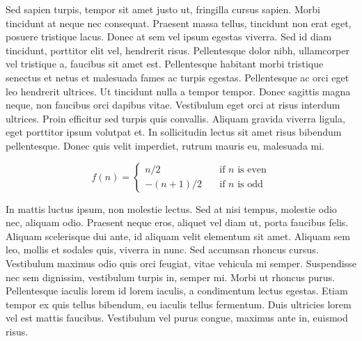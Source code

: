 Sed sapien turpis, tempor sit amet justo ut, fringilla cursus sapien. Morbi tincidunt at neque nec consequat. Praesent massa tellus, tincidunt non erat eget, posuere tristique lacus. Donec at sem vel ipsum egestas viverra. Sed id diam tincidunt, porttitor elit vel, hendrerit risus. Pellentesque dolor nibh, ullamcorper vel tristique a, faucibus sit amet est. Pellentesque habitant morbi tristique senectus et netus et malesuada fames ac turpis egestas. Pellentesque ac orci eget leo hendrerit ultrices. Ut tincidunt nulla a tempor tempor. Donec sagittis magna neque, non faucibus orci dapibus vitae. Vestibulum eget orci at risus interdum ultrices. Proin efficitur sed turpis quis convallis. Aliquam gravida viverra ligula, eget porttitor ipsum volutpat et. In sollicitudin lectus sit amet risus bibendum pellentesque. Donec quis velit imperdiet, rutrum mauris eu, malesuada mi.


\[ f(n) =
  \begin{cases}
    n/2       & \quad \text{if } n \text{ is even}\\
    -(n+1)/2  & \quad \text{if } n \text{ is odd}
  \end{cases}
\]

In mattis luctus ipsum, non molestie lectus. Sed at nisi tempus, molestie odio nec, aliquam odio. Praesent neque eros, aliquet vel diam ut, porta faucibus felis. Aliquam scelerisque dui ante, id aliquam velit elementum sit amet. Aliquam sem leo, mollis et sodales quis, viverra in nunc. Sed accumsan rhoncus cursus. Vestibulum maximus odio quis orci feugiat, vitae vehicula mi semper. Suspendisse nec sem dignissim, vestibulum turpis in, semper mi. Morbi ut rhoncus purus. Pellentesque iaculis lorem id lorem iaculis, a condimentum lectus egestas. Etiam tempor ex quis tellus bibendum, eu iaculis tellus fermentum. Duis ultricies lorem vel est mattis faucibus. Vestibulum vel purus congue, maximus ante in, euismod risus.
